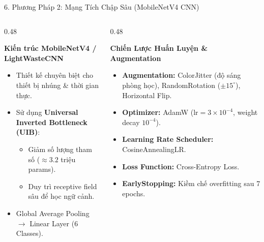 \documentclass[aspectratio=169, 10pt]{beamer}
\begin{document}
\begin{frame}{6. Phương Pháp 2: Mạng Tích Chập Sâu (MobileNetV4 CNN)}
\begin{columns}[T]
  \begin{column}{0.48\textwidth}
    \begin{block}{\textbf{Kiến trúc MobileNetV4 / LightWasteCNN}}
      \begin{itemize}
        \item Thiết kế chuyên biệt cho thiết bị nhúng \& thời gian thực.
        \item Sử dụng \textbf{Universal Inverted Bottleneck (UIB)}:
        \begin{itemize}
          \item Giảm số lượng tham số ($\approx 3.2$ triệu params).
          \item Duy trì receptive field sâu để học ngữ cảnh.
        \end{itemize}
        \item Global Average Pooling $\rightarrow$ Linear Layer (6 Classes).
      \end{itemize}
    \end{block}
  \end{column}

  \begin{column}{0.48\textwidth}
    \begin{block}{\textbf{Chiến Lược Huấn Luyện \& Augmentation}}
      \begin{itemize}
        \item \textbf{Augmentation:} ColorJitter (độ sáng phòng học), RandomRotation ($\pm 15^\circ$), Horizontal Flip.
        \item \textbf{Optimizer:} AdamW ($\text{lr} = 3 \times 10^{-4}$, weight decay $10^{-4}$).
        \item \textbf{Learning Rate Scheduler:} CosineAnnealingLR.
        \item \textbf{Loss Function:} Cross-Entropy Loss.
        \item \textbf{EarlyStopping:} Kiềm chế overfitting sau 7 epochs.
      \end{itemize}
    \end{block}
  \end{column}
\end{columns}
\end{frame}
\end{document}
